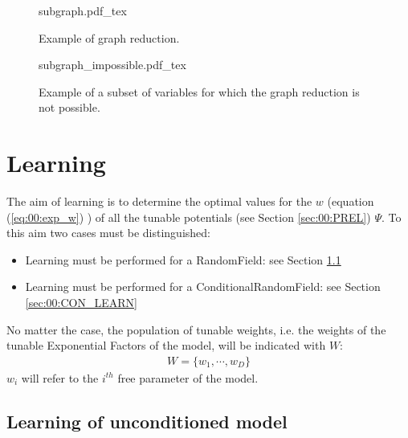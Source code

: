 \begin{figure}
	\centering
\def\svgwidth{0.7 \textwidth}
{subgraph.pdf_tex}
	\caption{Example of graph reduction.}
	\label{fig:00:subgraph}
\end{figure} 

\begin{figure}
	\centering
\def\svgwidth{0.2 \textwidth}
{subgraph_impossible.pdf_tex}
	\caption{Example of a subset of variables for which the graph reduction is not possible.}
	\label{fig:00:subgraph_impossible}
\end{figure} 

\section{Learning}
\label{sec:00:LEARN}

The aim of learning is to determine the optimal values for the $w$ (equation (\ref{eq:00:exp_w}) ) of all the tunable potentials (see Section \ref{sec:00:PREL}) $\Psi$.
To this aim two cases must be distinguished:
\begin{itemize}
\item Learning must be performed for a RandomField: see Section \ref{sec:00:UNC_LEARN}
\item Learning must be performed for a ConditionalRandomField: see Section \ref{sec:00:CON_LEARN} 
\end{itemize}
No matter the case, the population of tunable weights, i.e. the weights of the tunable Exponential Factors of the model, will be indicated with $W$:
\begin{eqnarray}
W = \lbrace w_1,\cdots , w_D \rbrace
\end{eqnarray}
$w_i$ will refer to the $i^{th}$ free parameter of the model.

\subsection{Learning of unconditioned model}
\label{sec:00:UNC_LEARN}

